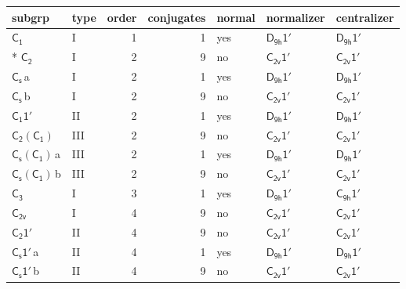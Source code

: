 \documentclass[10pt,a4paper]{article}
\numberwithin{equation}{section}
\newcommand{\grp}[1]{\mathsf{#1}}
\newcommand{\clsletter}[1]{\,{\scriptsize\color{black!55}#1}}
\begin{document}
{\small\begin{longtable}{@{}llrrlll@{}}\toprule
subgrp & type & order & conjugates & normal & normalizer & centralizer\\\midrule\endhead
\bottomrule\endfoot\endlastfoot
\href{../../../rotation/data/pdf/C1.pdf}{$\grp{C_{1}}$} & I & 1 & 1 & yes & \href{D9h-1p.pdf}{$\grp{D_{9h}1'}$} & \href{D9h-1p.pdf}{$\grp{D_{9h}1'}$}\\*
\href{../../../rotation/data/pdf/C2.pdf}{$\grp{C_{2}}$} & I & 2 & 9 & no & \href{C2v-1p.pdf}{$\grp{C_{2v}1'}$} & \href{C2v-1p.pdf}{$\grp{C_{2v}1'}$}\\
\href{../../../rotation/data/pdf/C1v.pdf}{$\grp{C_{s}}$}\clsletter{a} & I & 2 & 1 & yes & \href{D9h-1p.pdf}{$\grp{D_{9h}1'}$} & \href{D9h-1p.pdf}{$\grp{D_{9h}1'}$}\\
\href{../../../rotation/data/pdf/C1v.pdf}{$\grp{C_{s}}$}\clsletter{b} & I & 2 & 9 & no & \href{C2v-1p.pdf}{$\grp{C_{2v}1'}$} & \href{C2v-1p.pdf}{$\grp{C_{2v}1'}$}\\
\href{C1-1p.pdf}{$\grp{C_{1}1'}$} & II & 2 & 1 & yes & \href{D9h-1p.pdf}{$\grp{D_{9h}1'}$} & \href{D9h-1p.pdf}{$\grp{D_{9h}1'}$}\\
\href{C2-C1.pdf}{$\grp{C_{2}}(\grp{C_{1}})$} & III & 2 & 9 & no & \href{C2v-1p.pdf}{$\grp{C_{2v}1'}$} & \href{C2v-1p.pdf}{$\grp{C_{2v}1'}$}\\
\href{C1v-C1.pdf}{$\grp{C_{s}}(\grp{C_{1}})$}\clsletter{a} & III & 2 & 1 & yes & \href{D9h-1p.pdf}{$\grp{D_{9h}1'}$} & \href{D9h-1p.pdf}{$\grp{D_{9h}1'}$}\\
\href{C1v-C1.pdf}{$\grp{C_{s}}(\grp{C_{1}})$}\clsletter{b} & III & 2 & 9 & no & \href{C2v-1p.pdf}{$\grp{C_{2v}1'}$} & \href{C2v-1p.pdf}{$\grp{C_{2v}1'}$}\\
\href{../../../rotation/data/pdf/C3.pdf}{$\grp{C_{3}}$} & I & 3 & 1 & yes & \href{D9h-1p.pdf}{$\grp{D_{9h}1'}$} & \href{C9h-1p.pdf}{$\grp{C_{9h}1'}$}\\
\href{../../../rotation/data/pdf/C2v.pdf}{$\grp{C_{2v}}$} & I & 4 & 9 & no & \href{C2v-1p.pdf}{$\grp{C_{2v}1'}$} & \href{C2v-1p.pdf}{$\grp{C_{2v}1'}$}\\
\href{C2-1p.pdf}{$\grp{C_{2}1'}$} & II & 4 & 9 & no & \href{C2v-1p.pdf}{$\grp{C_{2v}1'}$} & \href{C2v-1p.pdf}{$\grp{C_{2v}1'}$}\\
\href{C1v-1p.pdf}{$\grp{C_{s}1'}$}\clsletter{a} & II & 4 & 1 & yes & \href{D9h-1p.pdf}{$\grp{D_{9h}1'}$} & \href{D9h-1p.pdf}{$\grp{D_{9h}1'}$}\\
\href{C1v-1p.pdf}{$\grp{C_{s}1'}$}\clsletter{b} & II & 4 & 9 & no & \href{C2v-1p.pdf}{$\grp{C_{2v}1'}$} & \href{C2v-1p.pdf}{$\grp{C_{2v}1'}$}\\

\end{longtable}}
\end{document}
